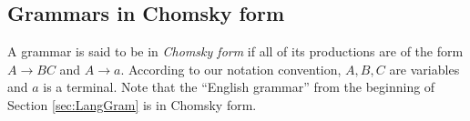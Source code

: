 

\setcounter{section}{5}
\setcounter{subsection}{2}
\setcounter{dfn}{5}

\subsection{Grammars in Chomsky form}
A grammar is said to be in \emph{Chomsky form} if all of its productions are of the form $A \to BC$ and $A \to a$.
According to our notation convention, $A, B, C$ are variables and $a$ is a terminal.
Note that the ``English grammar'' from the beginning of Section \ref{sec:LangGram} is in Chomsky form.


